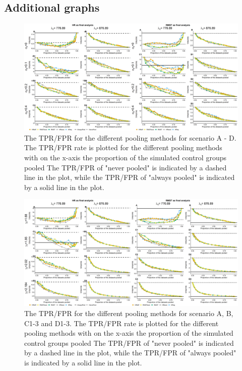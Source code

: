\documentclass[Royal,sagev,times]{sagej}
\begin{document}
\subsection{Additional graphs \label{A:additionalgraphs}} 
\begin{figure}[h!]
\includegraphics[width=13cm]{prop1.png}
  \caption{The TPR/FPR for the different pooling methods for scenario A - D. The TPR/FPR rate is plotted for the different pooling methods with on the x-axis the proportion of the simulated control groups pooled The TPR/FPR of "never pooled" is indicated by a dashed line in the plot, while the TPR/FPR of "always pooled" is indicated by a solid line in the plot.}
  \label{Prop1}
\end{figure}
\begin{figure}[h!]
\includegraphics[width=13cm]{prop2.png}
  \caption{The TPR/FPR for the different pooling methods for scenario A, B, C1-3 and D1-3. The TPR/FPR rate is plotted for the different pooling methods with on the x-axis the proportion of the simulated control groups pooled The TPR/FPR of "never pooled" is indicated by a dashed line in the plot, while the TPR/FPR of "always pooled" is indicated by a solid line in the plot.}
  \label{Prop2}
\end{figure}
\end{document}
